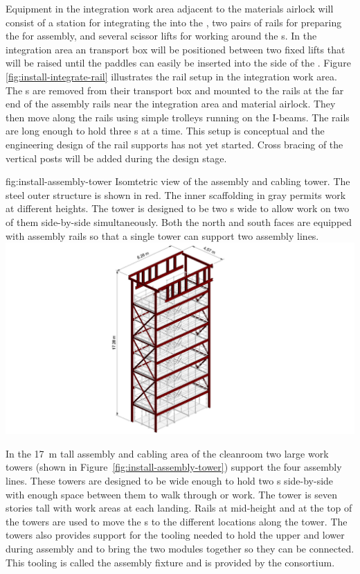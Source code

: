 Equipment in the integration work area adjacent to the materials airlock will consist of a station for integrating the  into the , two pairs of rails for preparing the  for assembly, and several scissor lifts for working around the s. 
In the  integration area an  transport box will be positioned between two fixed lifts that will be raised until the  paddles can easily be inserted into the side of the . 
Figure \ref{fig:install-integrate-rail} illustrates the rail setup in the integration work area. 
The s are removed from their transport box and mounted to the rails at the far end of the assembly rails near the  integration area and material airlock. 
They then move along the rails using simple trolleys running on the I-beams. 
The rails are long enough to hold three s at a time. 
This setup is conceptual and the engineering design of the rail supports has not yet started. 
Cross bracing of the vertical posts will be added during the design stage. 

\begin{dunefigure}{fig:install-assembly-tower}
  {
  Isomtetric view of the  assembly and cabling tower. The steel outer structure is shown in red. The inner scaffolding in gray permits work at different heights.
  The tower is designed to be two s wide to allow work on two of them side-by-side simultaneously. 
  Both the north and south faces are equipped with assembly rails so that 
   a single tower can support two assembly lines.
  }
\includegraphics[width=.5\textwidth]{graphics/install-assembly-tower.pdf}
\end{dunefigure}


In the \SI{17}{m} tall   assembly and cabling area of the cleanroom two large work towers (shown in Figure~\ref{fig:install-assembly-tower}) support the four assembly lines. 
These towers are designed to be wide enough to hold two s  side-by-side with enough space between them to walk through or work. 
The tower is seven stories tall with work areas at each landing.
Rails at mid-height and at the top of the towers are used to move the s to the different locations along the tower. 
The towers also provides support for the tooling needed to hold the upper and lower  during assembly and to bring the two modules together so they can be connected. This tooling is called the  assembly fixture and is provided by the  consortium. 

